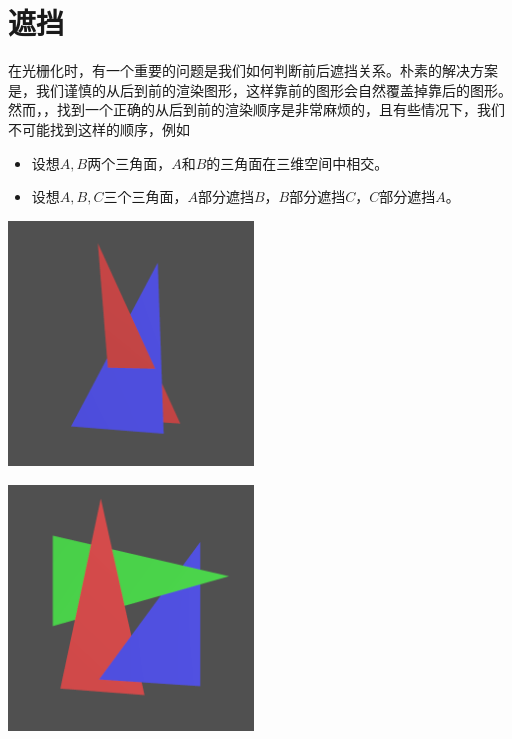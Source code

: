\section{遮挡}
在光栅化时，有一个重要的问题是我们如何判断前后遮挡关系。朴素的解决方案是，我们谨慎的从后到前的渲染图形，这样靠前的图形会自然覆盖掉靠后的图形。然而，，找到一个正确的从后到前的渲染顺序是非常麻烦的，且有些情况下，我们不可能找到这样的顺序，例如
\begin{itemize}
    \item 设想$A,B$两个三角面，$A$和$B$的三角面在三维空间中相交。
    \item 设想$A,B,C$三个三角面，$A$部分遮挡$B$，$B$部分遮挡$C$，$C$部分遮挡$A$。
\end{itemize}

\begin{Figure}[三角面的相互遮挡]
    \begin{FigureSub}[两个三角面相互穿过]
        \includegraphics[width=6.5cm]{image/RasterizationIOW/TrianglesA.png}
    \end{FigureSub}
    \hspace{0.5cm}
    \begin{FigureSub}[三个三角面循环遮挡]
        \includegraphics[width=6.5cm]{image/RasterizationIOW/TrianglesB.png}
    \end{FigureSub}
\end{Figure}

